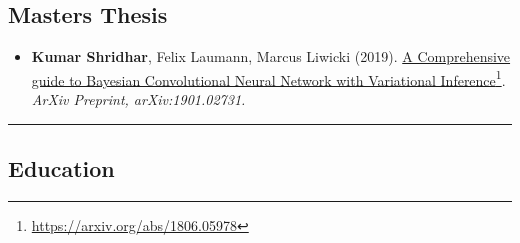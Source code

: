 \documentclass[10pt,letterpaper]{article}
\begin{document}
\subsection*{\color{MidnightBlue}Masters Thesis}
\begin{itemize}
	\parskip=0.1em
	
	\item 
	\textbf{Kumar Shridhar},  Felix Laumann, Marcus Liwicki (2019). \href{https://arxiv.org/abs/1901.02731}{A Comprehensive guide to Bayesian Convolutional Neural Network with Variational Inference}\footnote{\url{https://arxiv.org/abs/1806.05978}}. \emph{ArXiv Preprint, arXiv:1901.02731.}
	
\end{itemize}

\hrule
\vspace{-0.4em}

\subsection*{\color{MidnightBlue}Education}
\end{document}
